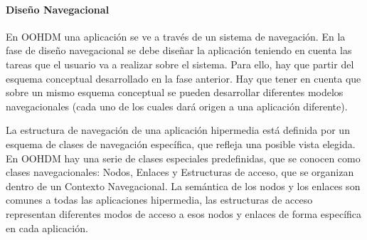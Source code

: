 \paragraph{Diseño Navegacional}
{\large En OOHDM una aplicación se ve a través de un sistema de navegación. En la fase de diseño navegacional se debe diseñar la aplicación teniendo en cuenta las tareas que el usuario va a realizar sobre el sistema. Para ello, hay que partir del esquema conceptual desarrollado en la fase anterior. Hay que tener en cuenta que sobre un mismo esquema conceptual se pueden desarrollar diferentes modelos navegacionales (cada uno de los cuales dará origen a una aplicación diferente).

La estructura de navegación de una aplicación hipermedia está definida por un esquema de clases de navegación específica, que refleja una posible vista elegida. En OOHDM hay una serie de clases especiales predefinidas, que se conocen como clases navegacionales: Nodos, Enlaces y Estructuras de acceso, que se organizan dentro de un Contexto Navegacional. La semántica de los nodos y los enlaces son comunes a todas las aplicaciones hipermedia, las estructuras de acceso representan diferentes modos de acceso a esos nodos y enlaces de forma específica en cada aplicación.}\\

